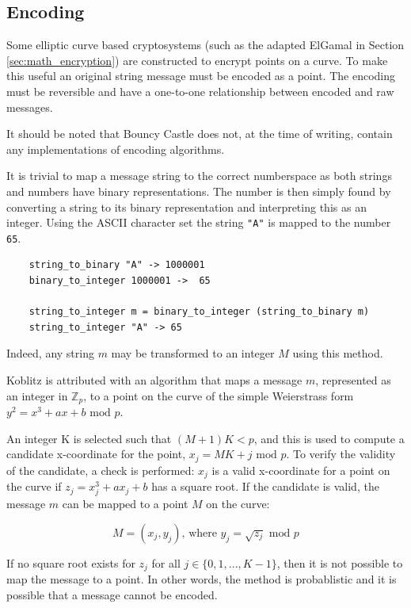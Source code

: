 \subsection{Encoding}
\label{sec:math_encoding}

Some elliptic curve based cryptosystems (such as the adapted ElGamal in Section \ref{sec:math_encryption}) are constructed to encrypt points on a curve. To make
this useful an original string message must be encoded as a point. The encoding must be reversible and have a one-to-one relationship between encoded and raw
messages.

It should be noted that Bouncy Castle does not, at the time of writing, contain any implementations of encoding algorithms.

It is trivial to map a message string to the correct numberspace as both strings and numbers have binary representations. The number is then
simply found by converting a string to its binary representation and interpreting this as an integer. Using the ASCII character set the string
\verb+"A"+ is mapped to the number \verb+65+.

\begin{verbatim}
    string_to_binary "A" -> 1000001
    binary_to_integer 1000001 ->  65
    
    string_to_integer m = binary_to_integer (string_to_binary m)
    string_to_integer "A" -> 65
\end{verbatim}

Indeed, any string \(m\) may be transformed to an integer \(M\) using this method.

Koblitz is attributed with an algorithm that maps a message \(m\), represented as an integer in \(\mathbb{Z}_p\), to a point on the curve of the
simple Weierstrass form \(y^2 = x^3 + ax + b \text{ mod } p\).\cite{MappingAMessage}

An integer K is selected such that \((M + 1)K < p\), and this is used to compute
a candidate x-coordinate for the point, \(x_j = MK + j \text{ mod } p\). To verify the validity of the candidate, a check is performed: \(x_j\)
is a valid x-coordinate for a point on the curve if \(z_j = x_j^3 + ax_j + b\) has a square root. If the candidate is valid, the message \(m\)
can be mapped to a point \(M\) on the curve:

\begin{equation}
	M = (x_j, y_j) \text{, where } y_j = \sqrt{z_j} \text{ mod } p
\end{equation}

If no square root exists for \(z_j\) for all \(j \in \{0,1,...,K-1\}\), then it is not possible to map the message to a point. In other
words, the method is probablistic and it is possible that a message cannot be encoded.

